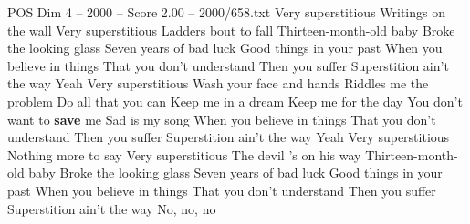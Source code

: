 \begin{textsample}{POS Dim 4 – 2000 – Score 2.00 – 2000/658.txt}  \label{ex:f4_pos_014}
Very superstitious Writings on the wall Very superstitious Ladders bout to fall Thirteen-month-old baby Broke the looking glass Seven years of bad luck Good things in your past When you believe in things That you don't understand Then you suffer Superstition ain't the way Yeah Very superstitious Wash your face and hands Riddles me the problem Do all that you can Keep me in a dream Keep me for the day You don't want to \textbf{save} me Sad is my song When you believe in things That you don't understand Then you suffer Superstition ain't the way Yeah Very superstitious Nothing more to say Very superstitious The devil 's on his way Thirteen-month-old baby Broke the looking glass Seven years of bad luck Good things in your past When you believe in things That you don't understand Then you suffer Superstition ain't the way No, no, no

\end{textsample}

